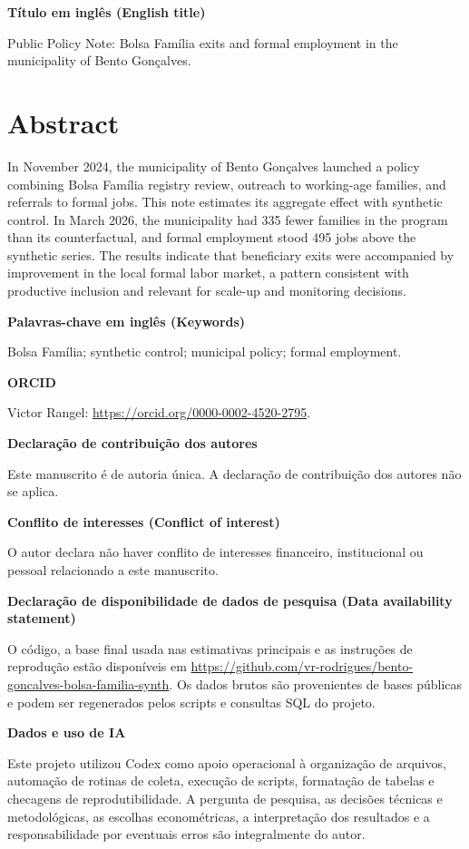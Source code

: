 \documentclass[10pt]{article}
\begin{document}
\textbf{Título em inglês (English title)}

Public Policy Note: Bolsa Família exits and formal employment in the municipality of Bento Gonçalves.

\section*{Abstract}

In November 2024, the municipality of Bento Gonçalves launched a policy combining Bolsa Família registry review, outreach to working-age families, and referrals to formal jobs. This note estimates its aggregate effect with synthetic control. In March 2026, the municipality had 335 fewer families in the program than its counterfactual, and formal employment stood 495 jobs above the synthetic series. The results indicate that beneficiary exits were accompanied by improvement in the local formal labor market, a pattern consistent with productive inclusion and relevant for scale-up and monitoring decisions.

\textbf{Palavras-chave em inglês (Keywords)}

Bolsa Família; synthetic control; municipal policy; formal employment.

\textbf{ORCID}

Victor Rangel: \href{https://orcid.org/0000-0002-4520-2795}{https://orcid.org/0000-0002-4520-2795}.

\textbf{Declaração de contribuição dos autores}

Este manuscrito é de autoria única. A declaração de contribuição dos autores não se aplica.

\textbf{Conflito de interesses (Conflict of interest)}

O autor declara não haver conflito de interesses financeiro, institucional ou pessoal relacionado a este manuscrito.

\textbf{Declaração de disponibilidade de dados de pesquisa (Data availability statement)}

O código, a base final usada nas estimativas principais e as instruções de reprodução estão disponíveis em \url{https://github.com/vr-rodrigues/bento-goncalves-bolsa-familia-synth}. Os dados brutos são provenientes de bases públicas e podem ser regenerados pelos scripts e consultas SQL do projeto.

\textbf{Dados e uso de IA}

Este projeto utilizou Codex como apoio operacional à organização de arquivos, automação de rotinas de coleta, execução de scripts, formatação de tabelas e checagens de reprodutibilidade. A pergunta de pesquisa, as decisões técnicas e metodológicas, as escolhas econométricas, a interpretação dos resultados e a responsabilidade por eventuais erros são integralmente do autor.
\end{document}
